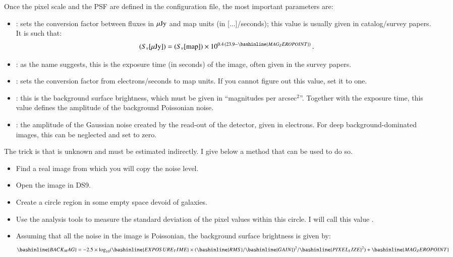 Once the pixel scale and the PSF are defined in the \skymaker configuration file, the most important parameters are:
\begin{itemize}
\item {}: sets the conversion factor between fluxes in $\mu{\rm Jy}$ and map units (in [...]/seconds); this value is usually given in catalog/survey papers. It is such that:
\begin{equation}
    (S_\nu [\uJy]) = (S_\nu [{\rm map}]) \times 10^{0.4\,(23.9 - \bashinline{MAG_ZEROPOINT})}\,. \nonumber
\end{equation}
\item {}: as the name suggests, this is the exposure time (in seconds) of the image, often given in the survey papers.
\item {}: sets the conversion factor from electrons/seconds to map units. If you cannot figure out this value, set it to one.
\item {}: this is the background surface brightness, which must be given in ``magnitudes per arcsec$^2$''. Together with the exposure time, this value defines the amplitude of the background Poissonian noise.
\item {}: the amplitude of the Gaussian noise created by the read-out of the detector, given in electrons. For deep background-dominated images, this can be neglected and set to zero.
\end{itemize}

The trick is that  is unknown and must be estimated indirectly. I give below a method that can be used to do so.
\begin{itemize}
\item Find a real image from which you will copy the noise level.
\item Open the image in DS9.
\item Create a circle region in some empty space devoid of galaxies.
\item Use the analysis tools to measure the standard deviation of the pixel values within this circle. I will call this value .
\item Assuming that all the noise in the image is Poissonian, the background surface brightness is given by:
\begin{equation}
    \bashinline{BACK_MAG} = -2.5\times\log_{10}(\bashinline{EXPOSURE_TIME} \times (\bashinline{RMS}/\bashinline{GAIN})^2/\bashinline{PIXEL_SIZE}^2) + \bashinline{MAG_ZEROPOINT} \nonumber
\end{equation}
\end{itemize}
